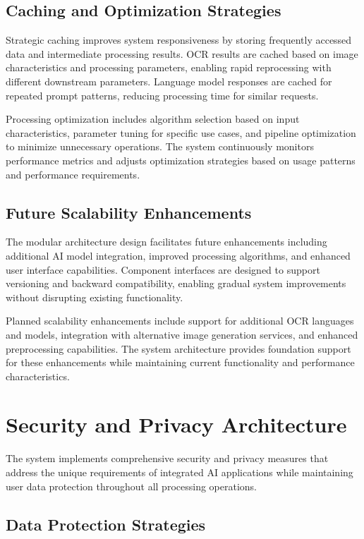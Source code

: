 \subsection{Caching and Optimization Strategies}

Strategic caching improves system responsiveness by storing frequently accessed data and intermediate processing results. OCR results are cached based on image characteristics and processing parameters, enabling rapid reprocessing with different downstream parameters. Language model responses are cached for repeated prompt patterns, reducing processing time for similar requests.

Processing optimization includes algorithm selection based on input characteristics, parameter tuning for specific use cases, and pipeline optimization to minimize unnecessary operations. The system continuously monitors performance metrics and adjusts optimization strategies based on usage patterns and performance requirements.

\subsection{Future Scalability Enhancements}

The modular architecture design facilitates future enhancements including additional AI model integration, improved processing algorithms, and enhanced user interface capabilities. Component interfaces are designed to support versioning and backward compatibility, enabling gradual system improvements without disrupting existing functionality.

Planned scalability enhancements include support for additional OCR languages and models, integration with alternative image generation services, and enhanced preprocessing capabilities. The system architecture provides foundation support for these enhancements while maintaining current functionality and performance characteristics.

\section{Security and Privacy Architecture}

The system implements comprehensive security and privacy measures that address the unique requirements of integrated AI applications while maintaining user data protection throughout all processing operations.

\subsection{Data Protection Strategies}

